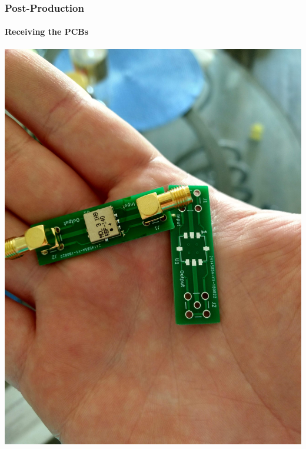 \documentclass[]{beamer}
\begin{document}
\begin{frame}
    \frametitle{Post-Production}
    \framesubtitle{Receiving the PCBs}
    \begin{center}
        \includegraphics[height=0.70\paperheight,keepaspectratio]{images/complete.jpg}
    \end{center}
\end{frame}
\end{document}
